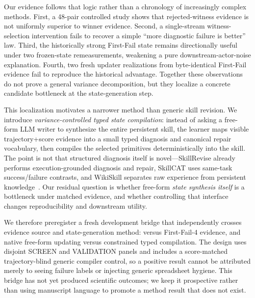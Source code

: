 Our evidence follows that logic rather than a chronology of increasingly complex methods. First, a 48-pair controlled study shows that rejected-witness evidence is not uniformly superior to winner evidence. Second, a single-stream witness-selection intervention fails to recover a simple ``more diagnostic failure is better'' law. Third, the historically strong First-Fail state remains directionally useful under two frozen-state remeasurements, weakening a pure downstream-actor-noise explanation. Fourth, two fresh updater realizations from byte-identical First-Fail evidence fail to reproduce the historical advantage. Together these observations do not prove a general variance decomposition, but they localize a concrete candidate bottleneck at the state-generation step.

This localization motivates a narrower method than generic skill revision. We introduce \emph{variance-controlled typed state compilation}: instead of asking a free-form LLM writer to synthesize the entire persistent skill, the learner maps visible trajectory+score evidence into a small typed diagnosis and canonical repair vocabulary, then compiles the selected primitives deterministically into the skill. The point is not that structured diagnosis itself is novel---SkillRevise already performs execution-grounded diagnosis and repair, SkillCAT uses same-task success/failure contrasts, and WikiSkill separates raw experience from persistent knowledge~\citep{liu2026skillrevise,chen2026skillcat,tang2026wikiskill}. Our residual question is whether free-form \emph{state synthesis itself} is a bottleneck under matched evidence, and whether controlling that interface changes reproducibility and downstream utility.

We therefore preregister a fresh development bridge that independently crosses evidence source and state-generation method: \win{} versus First-Fail-4 evidence, and native free-form updating versus constrained typed compilation. The design uses disjoint SCREEN and VALIDATION panels and includes a score-matched trajectory-blind generic compiler control, so a positive result cannot be attributed merely to seeing failure labels or injecting generic spreadsheet hygiene. This bridge has not yet produced scientific outcomes; we keep it prospective rather than using manuscript language to promote a method result that does not exist.

